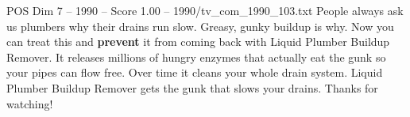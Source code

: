 \begin{textsample}{POS Dim 7 – 1990 – Score 1.00 – 1990/tv\_com\_1990\_103.txt}  \label{ex:f7_pos_062}
People always ask us plumbers why their drains run slow.
Greasy, gunky buildup is why.
Now you can treat this and \textbf{prevent} it from coming back with Liquid Plumber Buildup Remover.
It releases millions of hungry enzymes that actually eat the gunk so your pipes can flow free.
Over time it cleans your whole drain system.
Liquid Plumber Buildup Remover gets the gunk that slows your drains.
Thanks for watching!

\end{textsample}
